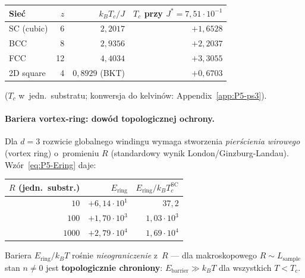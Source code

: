\begin{center}\footnotesize
\begin{tabular}{@{}lrrr@{}}
\toprule
Sie\'c     & $z$ & $k_B T_c/J$ & $T_c$ przy $J^* = 7{,}51\cdot10^{-1}$ \\
\midrule
SC (cubic)  & 6  & $2{,}2017$ & $+1{,}6528$ \\
BCC          & 8  & $2{,}9356$ & $+2{,}2037$ \\
FCC          & 12 & $4{,}4034$ & $+3{,}3055$ \\
2D square    & 4  & $0{,}8929$ (BKT) & $+0{,}6703$ \\
\bottomrule
\end{tabular}
\end{center}
($T_c$ w~jedn.~substratu; konwersja do kelvin\'ow: Appendix~\ref{app:P5-ps3}).

\label{app:P5-ps1-barrier}
\paragraph{Bariera vortex-ring: dow\'od topologicznej ochrony.}
Dla $d=3$ rozwicie globalnego windingu wymaga stworzenia
\emph{pier\'scienia wirowego} (vortex ring) o~promieniu $R$
(standardowy wynik London/Ginzburg-Landau).
Wz\'or~\eqref{eq:P5-Ering} daje:
\begin{center}\footnotesize
\begin{tabular}{@{}rrr@{}}
\toprule
$R$ (jedn.~substr.) & $E_\text{ring}$ & $E_\text{ring}/k_BT_c^\text{SC}$ \\
\midrule
$10$    & $+6{,}14\cdot10^{1}$ & $37{,}2$ \\
$100$   & $+1{,}70\cdot10^{3}$ & $1{,}03\cdot10^{3}$ \\
$1000$  & $+2{,}79\cdot10^{4}$ & $1{,}69\cdot10^{4}$ \\
\bottomrule
\end{tabular}
\end{center}
Bariera $E_\text{ring}/k_BT$ ro\'snie \emph{nieograniczenie} z~$R$ ---
dla makroskopowego $R\sim L_\text{sample}$ stan $n\neq 0$
jest \textbf{topologicznie chroniony}: $E_\text{barrier} \gg k_BT$
dla wszystkich $T<T_c$.

\label{app:P5-ps1-iff}
